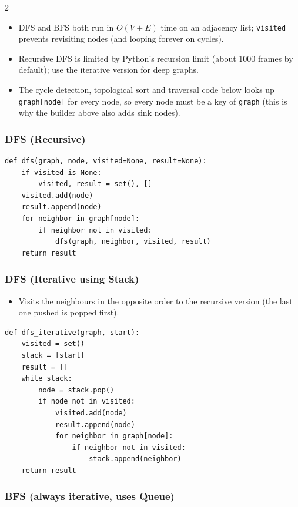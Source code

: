 \documentclass[9pt,a4paper]{extarticle}
\begin{document}
\begin{multicols}{2}
\begin{itemize}
\item DFS and BFS both run in $O(V+E)$ time on an adjacency list; \texttt{visited} prevents revisiting nodes (and looping forever on cycles).
\item Recursive DFS is limited by Python's recursion limit (about 1000 frames by default); use the iterative version for deep graphs.
\item The cycle detection, topological sort and traversal code below looks up \texttt{graph[\allowbreak{}node]} for every node, so every node must be a key of \texttt{graph} (this is why the builder above also adds sink nodes).
\end{itemize}

\subsubsection{DFS (Recursive)}

\begin{lstlisting}
def dfs(graph, node, visited=None, result=None):
    if visited is None:
        visited, result = set(), []
    visited.add(node)
    result.append(node)
    for neighbor in graph[node]:
        if neighbor not in visited:
            dfs(graph, neighbor, visited, result)
    return result
\end{lstlisting}

\subsubsection{DFS (Iterative using Stack)}

\begin{itemize}
\item Visits the neighbours in the opposite order to the recursive version (the last one pushed is popped first).
\end{itemize}

\begin{lstlisting}
def dfs_iterative(graph, start):
    visited = set()
    stack = [start]
    result = []
    while stack:
        node = stack.pop()
        if node not in visited:
            visited.add(node)
            result.append(node)
            for neighbor in graph[node]:
                if neighbor not in visited:
                    stack.append(neighbor)
    return result
\end{lstlisting}

\subsubsection{BFS (always iterative, uses Queue)}


\end{multicols}
\end{document}
